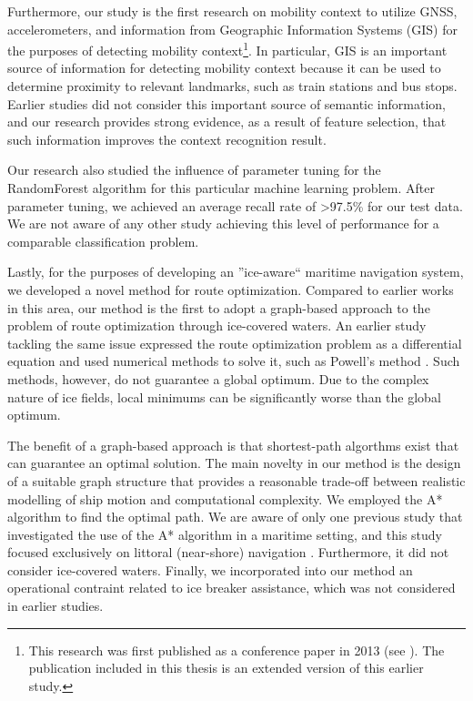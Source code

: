 Furthermore, our study is the first research on mobility context to utilize GNSS, accelerometers, and information from Geographic Information Systems (GIS) for the purposes of detecting mobility context\footnote{This research was first published as a conference paper in 2013 (see \cite{Guinness2013}). The publication included in this thesis is an extended version of this earlier study.}. In particular, GIS is an important source of information for detecting mobility context because it can be used to determine proximity to relevant landmarks, such as train stations and bus stops. Earlier studies did not consider this important source of semantic information, and our research provides strong evidence, as a result of feature selection, that such information improves the context recognition result.

Our research also studied the influence of parameter tuning for the RandomForest algorithm for this particular machine learning problem. After parameter tuning, we achieved an average recall rate of \textgreater97.5\% for our test data. We are not aware of any other study achieving this level of performance for a comparable classification problem.

Lastly, for the purposes of developing an ''ice-aware`` maritime navigation system, we developed a novel method for route optimization. Compared to earlier works in this area, our method is the first to adopt a graph-based approach to the problem of route optimization through ice-covered waters. An earlier study tackling the same issue expressed the route optimization problem as a differential equation and used numerical methods to solve it, such as Powell's method \cite{kotovirta2009system}. Such methods, however, do not guarantee a global optimum. Due to the complex nature of ice fields, local minimums can be significantly worse than the global optimum.

The benefit of a graph-based approach is that shortest-path algorthms exist that can guarantee an optimal solution. The main novelty in our method is the design of a suitable graph structure that provides a reasonable trade-off between realistic modelling of ship motion and computational complexity. We employed the A* algorithm to find the optimal path. We are aware of only one previous study that investigated the use of the A* algorithm in a maritime setting, and this study focused exclusively on littoral (near-shore) navigation \cite{cummings2010supporting}. Furthermore, it did not consider ice-covered waters. Finally, we incorporated into our method an operational contraint related to ice breaker assistance, which was not considered in earlier studies. 

